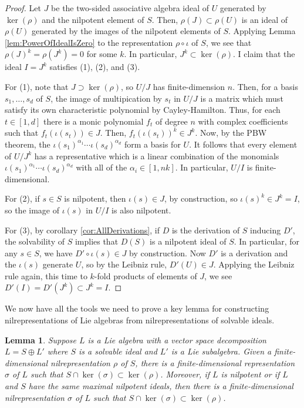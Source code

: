 \documentclass[10pt]{amsart}
\newtheorem{lem}[thm]{Lemma}
\theoremstyle{definition}
\theoremstyle{remark}
\numberwithin{equation}{section}
\begin{document}
\begin{proof}
Let $J$ be the two-sided associative algebra ideal of $U$ generated by $\ker(\rho)$ and the nilpotent element of $S$. Then, $\rho(J) \subset \rho(U)$ is an ideal of $\rho(U)$ generated by the images of the nilpotent elements of $S$. Applying Lemma \ref{lem:PowerOfIdealIsZero} to the representation $\rho\circ\iota$ of $S$, we see that $\rho(J)^k = \rho(J^k) = 0$ for some $k$. In particular, $J^{k} \subset \ker(\rho)$. I claim that the ideal $I = J^k$ satisfies (1), (2), and (3).

For (1), note that $J \supset \ker(\rho)$, so $U/J$ has finite-dimension $n$. Then, for a basis $s_1,\dots, s_{d}$ of $S$, the image of multipication by $s_{t}$ in $U/J$ is a matrix which must satisfy its own characteristic polynomial by Cayley-Hamilton. Thus, for each $t \in [1,d]$ there is a monic polynomial $f_t$ of degree $n$ with complex coefficients such that $f_t(\iota(s_t)) \in J$. Then, $f_t(\iota(s_t))^{k} \in J^{k}$. Now, by the PBW theorem, the $\iota(s_{1})^{\alpha_{1}} \cdots \iota(s_{d})^{\alpha_{d}}$ form a basis for $U$. It follows that every element of $U/J^{k}$ has a representative which is a linear combination of the monomials $\iota(s_{1})^{\alpha_{1}} \cdots \iota(s_{d})^{\alpha_{d}}$ with all of the $\alpha_{i} \in [1,nk]$. In particular, $U/I$ is finite-dimensional.

For (2), if $s \in S$ is nilpotent, then $\iota(s) \in J$, by construction, so $\iota(s)^{k} \in J^{k}= I$, so the image of $\iota(s)$ in $U/I$ is also nilpotent.

For (3), by corollary \ref{cor:AllDerivations}, if $D$ is the derivation of $S$ inducing $D'$, the solvability of $S$ implies that $D(S)$ is a nilpotent ideal of $S$. In particular, for any $s \in S$, we have $D' \circ\iota(s) \in J$ by construction. Now $D'$ is a derivation and the $\iota(s)$ generate $U$, so by the Leibniz rule, $D'(U) \in J$. Applying the Leibniz rule again, this time to $k$-fold products of elements of $J$, we see $D'(I) = D'(J^{k}) \subset J^{k} = I$.
\end{proof}

We now have all the tools we need to prove a key lemma for constructing nilrepresentations of Lie algebras from nilrepresentations of solvable ideals.

\begin{lem} \label{lem:InductionLemma}
Suppose $L$ is a Lie algebra with a vector space decomposition $L = S \oplus L'$ where $S$ is a solvable ideal and $L'$ is a Lie subalgebra. Given a finite-dimensional nilrepresentation $\rho$ of $S$, there is a finite-dimensional representation $\sigma$ of $L$ such that $S \cap \ker(\sigma) \subset \ker(\rho)$. Moreover, if $L$ is nilpotent or if $L$ and $S$ have the same maximal nilpotent ideals, then there is a finite-dimensional \emph{nil}representation $\sigma$ of $L$ such that $S \cap \ker(\sigma) \subset \ker(\rho)$.
\end{lem}
\end{document}
